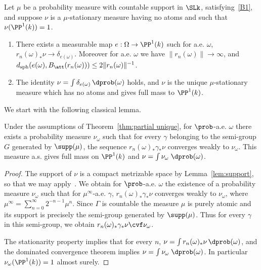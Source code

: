 \begin{theo}\label{thm:partial unique}
Let $\mu$ be a probability measure with countable support in $\SLk$, satisfying~\eqref{B1}, and suppose $\nu$ is a $\mu$-stationary measure having no atoms and such that $\nu(\PP^1(k)) = 1$.
\begin{enumerate}
\item There exists a measurable map $e: \Omega \to \PP^1(k)$ such for a.e. $\omega$, $r_n(\omega)_* \nu \to \delta_{e(\omega)}$. Moreover for a.e. $\omega$ we have $\|r_n(\omega)\| \to \infty$, and $d_{\mathrm{sph}}(e(\omega), B_\att(r_n(\omega))) \le 2 \|r_n(\omega)\|^{-1}$.
\item The identity $\nu = \int \delta_{e(\omega)} \, \dprob(\omega)$ holds, and $\nu$ is the unique $\mu$-stationary measure which has no atoms and gives full mass to $\PP^1(k)$.
\end{enumerate}
\end{theo}

We start with the following classical lemma.

\begin{lemm}\label{lem:guivarch raugi}
Under the assumptions of Theorem~\ref{thm:partial unique}, for $\prob$-a.e. $\omega$ there exists a probability measure $\nu_\omega$ such that for every $\gamma$ belonging to the semi-group $G$ generated by $\supp(\mu)$, the sequence $r_n(\omega)_*\gamma_*\nu$ converges weakly to $\nu_\omega$. This measure a.s. gives full mass on $\PP^1(k)$ and $\nu = \int \nu_\omega \; \dprob(\omega)$.
\end{lemm}

\begin{proof}
The support of $\nu$ is a compact metrizable space by Lemma~\ref{lem:support}, so that we may apply~\cite[Lem.~2.1, p.~19]{bougerol-lacroix}. We obtain for $\prob$-a.e. $\omega$ the existence of a probability measure $\nu_\omega$ such that for $\mu^\infty$-a.e. $\gamma$, $r_n(\omega)_*\gamma_*\nu$ converges weakly to $\nu_\omega$, where $\mu^\infty = \sum_{n = 0}^\infty 2^{-n-1}\mu^n$. Since $\Gamma$ is countable the measure $\mu$ is purely atomic and its support is precisely the semi-group generated by $\supp(\mu)$. Thus for every $\gamma$ in this semi-group, we obtain $r_n(\omega)_*\gamma_*\nu \cvf \nu_\omega$.

The stationarity property implies that for every $n$, $\nu = \int r_n(\omega)_* \nu\, \dprob(\omega)$, and the dominated convergence theorem implies $\nu = \int \nu_\omega \; \dprob(\omega)$. In particular $\nu_\omega(\PP^1(k)) =1$ almost surely.
\end{proof}

